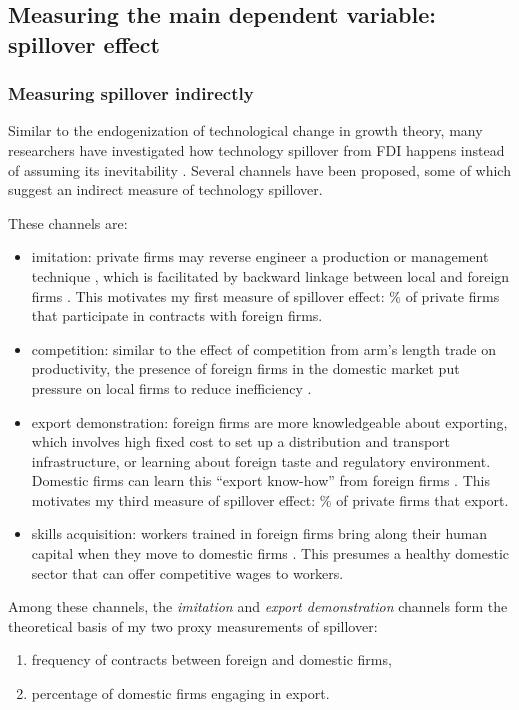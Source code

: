 \subsection{Measuring the main dependent variable: spillover effect}
\label{sec:measure_spillover}

\subsubsection*{Measuring spillover indirectly}

Similar to the endogenization of technological change in growth theory, many researchers have investigated how technology spillover from FDI happens instead of assuming its inevitability \citep{Romer1994}. Several channels have been proposed, some of which suggest an indirect measure of technology spillover.

These channels are:
\begin{itemize}
	\item imitation:  private firms may reverse engineer a production or management technique \citep{Wang1992}, which is facilitated by backward linkage between local and foreign firms \citep{Javorcik2004}. This motivates my first measure of spillover effect: \% of private firms that participate in contracts with foreign firms.
	\item competition: similar to the effect of competition from arm's length trade on productivity, the presence of foreign firms in the domestic market put pressure on local firms to reduce inefficiency \citep{Glass2002}.
	\item export demonstration: foreign firms are more knowledgeable about exporting, which involves high fixed cost to set up a distribution and transport infrastructure, or learning about foreign taste and regulatory environment. Domestic firms can learn this ``export know-how'' from foreign firms \citep{Aitken1997}. This motivates my third measure of spillover effect: \% of private firms that export.
	\item skills acquisition: workers trained in foreign firms bring along their human capital when they move to domestic firms \citep{Djankov2000}. This presumes a healthy domestic sector that can offer competitive wages to workers.
\end{itemize}

Among these channels, the \textit{imitation} and \textit{export demonstration} channels form the theoretical basis of my two proxy measurements of spillover:
\begin{enumerate}
\item frequency of contracts between foreign and domestic firms,
\item percentage of domestic firms engaging in export.
\end{enumerate}

